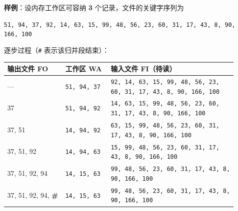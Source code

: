 \documentclass[11pt,openany,UTF8]{ctexbook}
\begin{document}
\textbf{样例}：设内存工作区可容纳 \textbf{3} 个记录，文件的关键字序列为

\texttt{51,\allowbreak{} 94,\allowbreak{} 37,\allowbreak{} 92,\allowbreak{} 14,\allowbreak{} 63,\allowbreak{} 15,\allowbreak{} 99,\allowbreak{} 48,\allowbreak{} 56,\allowbreak{} 23,\allowbreak{} 60,\allowbreak{} 31,\allowbreak{} 17,\allowbreak{} 43,\allowbreak{} 8,\allowbreak{} 90,\allowbreak{} 166,\allowbreak{} 100}

逐步过程（\texttt{\#} 表示该归并段结束）：

\begingroup\small\setlength{\tabcolsep}{4.0pt}
\begin{longtable}{@{}L{0.2358\linewidth}L{0.1856\linewidth}L{0.5070\linewidth}@{}}
\toprule
\textbf{输出文件 FO} & \textbf{工作区 WA} & \textbf{输入文件 FI（待读）} \\
\midrule
\endhead
— & \texttt{51,\allowbreak{} 94,\allowbreak{} 37} & \texttt{92,\allowbreak{} 14,\allowbreak{} 63,\allowbreak{} 15,\allowbreak{} 99,\allowbreak{} 48,\allowbreak{} 56,\allowbreak{} 23,\allowbreak{} 60,\allowbreak{} 31,\allowbreak{} 17,\allowbreak{} 43,\allowbreak{} 8,\allowbreak{} 90,\allowbreak{} 166,\allowbreak{} 100} \\
37 & \texttt{51,\allowbreak{} 94,\allowbreak{} 92} & \texttt{14,\allowbreak{} 63,\allowbreak{} 15,\allowbreak{} 99,\allowbreak{} 48,\allowbreak{} 56,\allowbreak{} 23,\allowbreak{} 60,\allowbreak{} 31,\allowbreak{} 17,\allowbreak{} 43,\allowbreak{} 8,\allowbreak{} 90,\allowbreak{} 166,\allowbreak{} 100} \\
37, 51 & \texttt{14,\allowbreak{} 94,\allowbreak{} 92} & \texttt{63,\allowbreak{} 15,\allowbreak{} 99,\allowbreak{} 48,\allowbreak{} 56,\allowbreak{} 23,\allowbreak{} 60,\allowbreak{} 31,\allowbreak{} 17,\allowbreak{} 43,\allowbreak{} 8,\allowbreak{} 90,\allowbreak{} 166,\allowbreak{} 100} \\
37, 51, 92 & \texttt{14,\allowbreak{} 94,\allowbreak{} 63} & \texttt{15,\allowbreak{} 99,\allowbreak{} 48,\allowbreak{} 56,\allowbreak{} 23,\allowbreak{} 60,\allowbreak{} 31,\allowbreak{} 17,\allowbreak{} 43,\allowbreak{} 8,\allowbreak{} 90,\allowbreak{} 166,\allowbreak{} 100} \\
37, 51, 92, 94 & \texttt{14,\allowbreak{} 15,\allowbreak{} 63} & \texttt{99,\allowbreak{} 48,\allowbreak{} 56,\allowbreak{} 23,\allowbreak{} 60,\allowbreak{} 31,\allowbreak{} 17,\allowbreak{} 43,\allowbreak{} 8,\allowbreak{} 90,\allowbreak{} 166,\allowbreak{} 100} \\
37, 51, 92, 94, \textbf{\#} & \texttt{14,\allowbreak{} 15,\allowbreak{} 63} & \texttt{99,\allowbreak{} 48,\allowbreak{} 56,\allowbreak{} 23,\allowbreak{} 60,\allowbreak{} 31,\allowbreak{} 17,\allowbreak{} 43,\allowbreak{} 8,\allowbreak{} 90,\allowbreak{} 166,\allowbreak{} 100} \\

\end{longtable}
\end{document}
